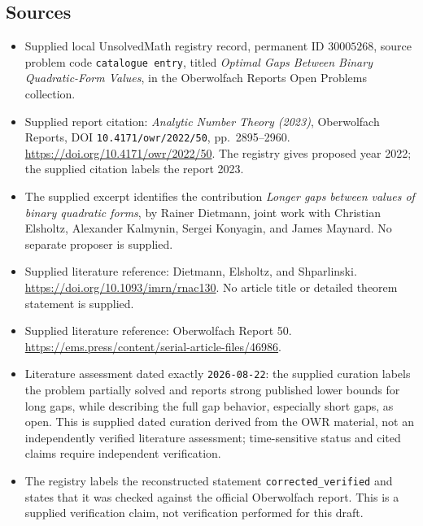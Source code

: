 \documentclass[11pt]{article}
\begin{document}
\subsection{Sources}
\begin{itemize}
\item Supplied local UnsolvedMath registry record, permanent ID \(30005268\), source problem code \texttt{catalogue entry}, titled \emph{Optimal Gaps Between Binary Quadratic-Form Values}, in the Oberwolfach Reports Open Problems collection.
\item Supplied report citation: \emph{Analytic Number Theory (2023)}, Oberwolfach Reports, DOI \texttt{10.4171/owr/2022/50}, pp.\ 2895--2960. \url{https://doi.org/10.4171/owr/2022/50}. The registry gives proposed year 2022; the supplied citation labels the report 2023.
\item The supplied excerpt identifies the contribution \emph{Longer gaps between values of binary quadratic forms}, by Rainer Dietmann, joint work with Christian Elsholtz, Alexander Kalmynin, Sergei Konyagin, and James Maynard. No separate proposer is supplied.
\item Supplied literature reference: Dietmann, Elsholtz, and Shparlinski. \url{https://doi.org/10.1093/imrn/rnac130}. No article title or detailed theorem statement is supplied.
\item Supplied literature reference: Oberwolfach Report 50. \url{https://ems.press/content/serial-article-files/46986}.
\item Literature assessment dated exactly \texttt{2026-08-22}: the supplied curation labels the problem partially solved and reports strong published lower bounds for long gaps, while describing the full gap behavior, especially short gaps, as open. This is supplied dated curation derived from the OWR material, not an independently verified literature assessment; time-sensitive status and cited claims require independent verification.
\item The registry labels the reconstructed statement \texttt{corrected\_verified} and states that it was checked against the official Oberwolfach report. This is a supplied verification claim, not verification performed for this draft.
\end{itemize}
\end{document}
